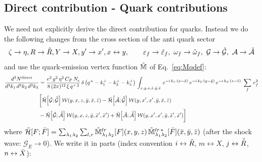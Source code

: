 \documentclass[9pt]{article}
\newcommand{\eps}{\varepsilon_{f}}           %
\newcommand{\epsq}{\Tilde{\varepsilon}_{f}}  %
\newcommand{\om}{\omega_{f}}                 %
\newcommand{\omq}{\Tilde{\omega}_{f}}        %
\newcommand{\GE}{\mathcal{G}_{E}}            %
\newcommand{\Mq}{\Tilde{\mathbb{M}}}
\newcommand{\Hs}{\mathcal{H}}
\numberwithin{equation}{section}
\begin{document}
\subsection{Direct contribution - Quark contributions}
We need not explicitly derive the direct contribution for quarks. Instead we do the following changes from the cross section of the anti quark sector
$$\zeta \rightarrow \eta, R\rightarrow \Tilde{R}, Y\rightarrow X, y'\rightarrow x', x\leftrightarrow y,\hspace{2em} \eps\rightarrow\epsq,\ \om\rightarrow\omq,\ \mathcal{G}\rightarrow\Tilde{\mathcal{G}},\ \mathcal{A}\rightarrow\Tilde{\mathcal{A}}$$
and use the quark-emission vertex function $\Mq$ of Eq.~\eqref{eq:Mqdef}:
\begin{align}
     \frac{d^{3}N^{\text{direct}}}{d^{3}k_{1}\,d^{3}k_{2}\, d^{3}k_{3}} & = \frac{e^{2}\,g^{2}\,\eta^{2}\,C_{F}\,N_{c}}{8\, (2\pi)^{12}\,\xi\,q^{+\,2}}\, \delta\left(q^{+}-k^{+}_{1}-k^{+}_{2}-k^{+}_{3}\right)\, \int_{x,y,z,\Bar{x},\Bar{y},\Bar{z}}\, e^{-i\,k_{1}\cdot (x-\Bar{x})}\, e^{-i\,k_{2}\cdot (y-\Bar{y})}\, e^{-i\,k_{3}\cdot (z-\Bar{z})}\;\sum_{f}\,e^{2}_{f}\notag \\ & \bigg[ \Tilde{\Hs}\!\left[\Tilde{\mathcal{G}};\Bar{\Tilde{\mathcal{G}}}\right]\mathcal{W}(y,x,z,\Bar{y},\Bar{x},\Bar{z})-\Tilde{\Hs}\!\left[\Tilde{\mathcal{A}};\Bar{\Tilde{\mathcal{G}}}\right]\mathcal{W}(y,x',x',\Bar{y},\Bar{x},\Bar{z})\notag \\ & -\Tilde{\Hs}\!\left[\Tilde{\mathcal{G}};\Bar{\Tilde{\mathcal{A}}}\right]\mathcal{W}(y,x,z,\Bar{y},\Bar{x}',\Bar{x}')+ \Tilde{\Hs}\!\left[\Tilde{\mathcal{A}};\Bar{\Tilde{\mathcal{A}}}\right]\mathcal{W}(y,x',x',\Bar{y},\Bar{x}',\Bar{x}')\bigg]
\end{align}
where $\Tilde{\Hs}[F;\Bar{F}] = \sum_{\lambda_{1}\lambda_{2}}\sum_{l,r}\Mq^{lr}_{\lambda_{1}\lambda_{2}}[F](x,y,z)\,\Mq^{lr\,*}_{\lambda_{1}\lambda_{2}}[\Bar{F}](\Bar{x},\Bar{y},\Bar{z})$ (after the shock wave: $\GE\rightarrow 0$). We write it in parts (index convention $i\leftrightarrow\Tilde{R}$, $m\leftrightarrow X$, $j\leftrightarrow\Bar{\Tilde{R}}$, $n\leftrightarrow\Bar{X}$):
\end{document}
